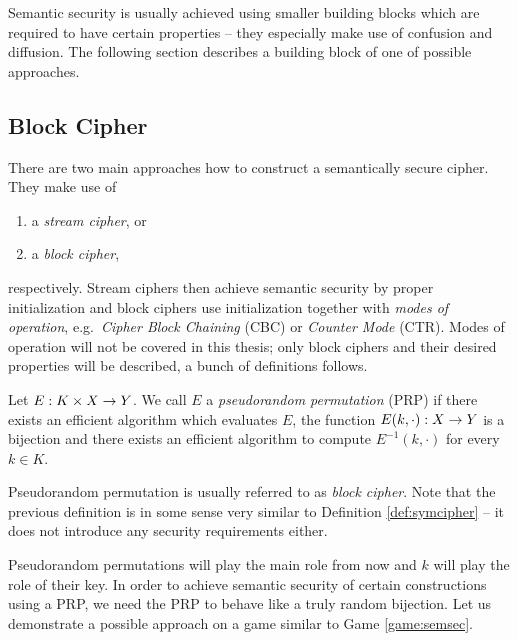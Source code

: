 	Semantic security is usually achieved using smaller building blocks which are required to have certain properties -- they especially make use of confusion and diffusion. The following section describes a building block of one of possible approaches.



\subsection{Block Cipher}

There are two main approaches how to construct a semantically secure cipher. They make use of
\begin{enumerate}
	\item a {\em stream cipher}, or
	\item a {\em block cipher},
\end{enumerate}
respectively. Stream ciphers then achieve semantic security by proper initialization and block ciphers use initialization together with {\em modes of operation}, e.g.\ {\em Cipher Block Chaining} (CBC) or {\em Counter Mode} (CTR). Modes of operation will not be covered in this thesis; only block ciphers and their desired properties will be described, a bunch of definitions follows.

\begin{defn}
\label{def:prp}
	Let $E: K\times X\rightarrow Y$. We call $E$ a {\em pseudorandom permutation} (PRP) if there exists an efficient algorithm which evaluates $E$, the function $E(k,\cdot): X\rightarrow Y$ is a bijection and there exists an efficient algorithm to compute $E^{-1}(k,\cdot)$ for every $k\in K$.
\end{defn}

\begin{note}
	Pseudorandom permutation is usually referred to as {\em block cipher}. Note that the previous definition is in some sense very similar to Definition \ref{def:symcipher} -- it does not introduce any security requirements either.
\end{note}

Pseudorandom permutations will play the main role from now and $k$ will play the role of their key. In order to achieve semantic security of certain constructions using a PRP, we need the PRP to behave like a truly random bijection. Let us demonstrate a possible approach on a game similar to Game \ref{game:semsec}.

